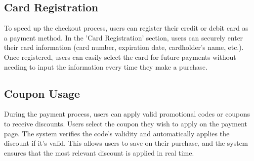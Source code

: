 \documentclass[conference]{IEEEtran}
\begin{document}
\subsection{Card Registration} 
To speed up the checkout process, users can register their credit or debit card as a payment method. In the 'Card Registration' section, users can securely enter their card information (card number, expiration date, cardholder’s name, etc.). Once registered, users can easily select the card for future payments without needing to input the information every time they make a purchase.

\subsection{Coupon Usage} 
During the payment process, users can apply valid promotional codes or coupons to receive discounts. Users select the coupon they wish to apply on the payment page. The system verifies the code’s validity and automatically applies the discount if it's valid. This allows users to save on their purchase, and the system ensures that the most relevant discount is applied in real time.
\end{document}
